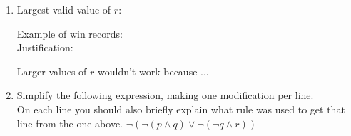 \documentclass[12pt]{article}
\begin{document}
  
\pagestyle{empty}
 



%
%
%


\begin{enumerate}


\item


%
%


{\color{blue}
Largest valid value of $r$:  


\vskip1cm

Example of win records: \\

Justification: 


\vskip2cm
Larger values of $r$ wouldn't work because ...

}







\newpage

\item
Simplify the following expression, making one modification per line.\\
On each line you should also  briefly explain what rule was used to get that line from the one above. 
$\neg ( \neg (p\land q) \lor \neg (\neg q \land r) )$ \\


\end{enumerate}
\end{document}

